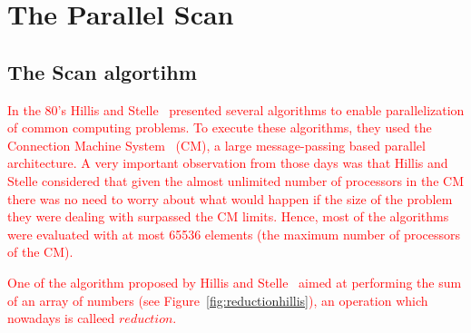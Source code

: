 \documentclass[Ingles]{ic-tese-v1}
\newcommand{\ed}[1]{\noindent\textcolor{red}{ {#1}}}
\newcommand{\ed}[1]{}
\newcommand{\rfig}[1]{Figure~\ref{fig:#1}}
\begin{document}
\chapter{The Parallel Scan}
\label{cap:Scan}

\section{The Scan algortihm}
\label{sec:ScanAlg}

\ed{In the 80's Hillis and Stelle~\cite{dataparallel} presented several algorithms to enable parallelization of common computing problems. To execute these algorithms, they used the Connection Machine System~\cite{themachine} (CM), a large message-passing  based parallel architecture. A  very important observation from those days was that Hillis and Stelle considered that given the almost unlimited number of processors in the CM  there was no need to worry about what would happen if the size of the problem they were dealing with surpassed the CM limits. Hence, most of the algorithms were evaluated  with at most 65536 elements (the maximum number of processors of the CM).}

\ed{One of the algorithm proposed by Hillis and Stelle~\cite{dataparallel} aimed at  performing the sum of an array of numbers (see \rfig{reductionhillis}), an operation which nowadays is calleed  $reduction$.}
	
\end{document}
